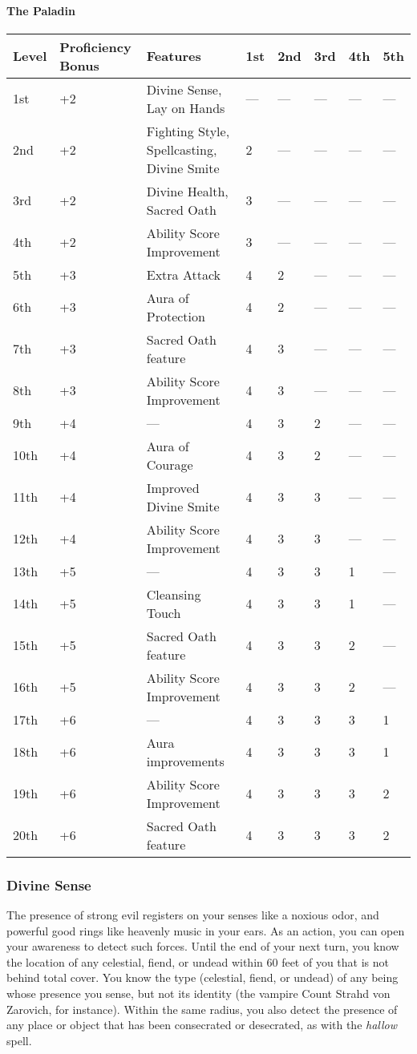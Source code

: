 \documentclass[
]{article}
\begin{document}
\hypertarget{the-paladin}{%
\paragraph{The Paladin}\label{the-paladin}}

\begin{longtable}[]{@{}llllllll@{}}
\toprule
Level & Proficiency Bonus & Features & 1st & 2nd & 3rd & 4th &
5th\tabularnewline
\midrule
\endhead
1st & +2 & Divine Sense, Lay on Hands & --- & --- & --- & --- &
---\tabularnewline
2nd & +2 & Fighting Style, Spellcasting, Divine Smite & 2 & --- & --- &
--- & ---\tabularnewline
3rd & +2 & Divine Health, Sacred Oath & 3 & --- & --- & --- &
---\tabularnewline
4th & +2 & Ability Score Improvement & 3 & --- & --- & --- &
---\tabularnewline
5th & +3 & Extra Attack & 4 & 2 & --- & --- & ---\tabularnewline
6th & +3 & Aura of Protection & 4 & 2 & --- & --- & ---\tabularnewline
7th & +3 & Sacred Oath feature & 4 & 3 & --- & --- & ---\tabularnewline
8th & +3 & Ability Score Improvement & 4 & 3 & --- & --- &
---\tabularnewline
9th & +4 & --- & 4 & 3 & 2 & --- & ---\tabularnewline
10th & +4 & Aura of Courage & 4 & 3 & 2 & --- & ---\tabularnewline
11th & +4 & Improved Divine Smite & 4 & 3 & 3 & --- & ---\tabularnewline
12th & +4 & Ability Score Improvement & 4 & 3 & 3 & --- &
---\tabularnewline
13th & +5 & --- & 4 & 3 & 3 & 1 & ---\tabularnewline
14th & +5 & Cleansing Touch & 4 & 3 & 3 & 1 & ---\tabularnewline
15th & +5 & Sacred Oath feature & 4 & 3 & 3 & 2 & ---\tabularnewline
16th & +5 & Ability Score Improvement & 4 & 3 & 3 & 2 &
---\tabularnewline
17th & +6 & --- & 4 & 3 & 3 & 3 & 1\tabularnewline
18th & +6 & Aura improvements & 4 & 3 & 3 & 3 & 1\tabularnewline
19th & +6 & Ability Score Improvement & 4 & 3 & 3 & 3 & 2\tabularnewline
20th & +6 & Sacred Oath feature & 4 & 3 & 3 & 3 & 2\tabularnewline
\bottomrule
\end{longtable}

\hypertarget{divine-sense}{%
\subsubsection{Divine Sense}\label{divine-sense}}

The presence of strong evil registers on your senses like a noxious
odor, and powerful good rings like heavenly music in your ears. As an
action, you can open your awareness to detect such forces. Until the end
of your next turn, you know the location of any celestial, fiend, or
undead within 60 feet of you that is not behind total cover. You know
the type (celestial, fiend, or undead) of any being whose presence you
sense, but not its identity (the vampire Count Strahd von Zarovich, for
instance). Within the same radius, you also detect the presence of any
place or object that has been consecrated or desecrated, as with the
\emph{hallow} spell.
\end{document}
